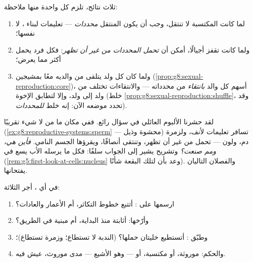 \begin{proposition}\label{prop:g9:heredity-and-traits:conclusions}
ثلاث نتائج، تلزم كل واحدة منها ملاحظة:
\begin{enumerate}
  \item لما كانت  المكتسبة لا تنتقل، وجب أن يكون
        المنتقل \emph{محددات} --- تعليمات لبناء ،
        لا  نفسها؛
  \item ولما كانت  تقفز أجيالًا، أمكن أن
        \emph{تحمل المحددات من غير أن تظهر}: فكل فرد
        يحمل أكثر مما يعرض؛
  \item ولما كان كل ولد يتلقى من والديه معًا بمشيجين
        (\cref{prop:g8:sexual-reproduction:core})، أسهم
        كل والد \emph{بانتقاء} من محدداته ---
        والانتقاءات تختلف من ولد إلى ولد، وإلا لتطابق
        الإخوة (خلط
        \cref{prop:g8:sexual-reproduction:shuffle}، وقد
        تحدد موضعه الآن: إنه خلط \emph{للمحددات}).
\end{enumerate}
\end{proposition}
\admitted

\begin{remark}\label{rem:g9:heredity-and-traits:question}
لقد حشرنا الألبوم العائلي في سؤال رائع. ففي مكان ما من
لا شيء  تقريبًا
(\cref{ex:g8:reproductive-systems:sperm} ---  محشوة
وذيل) تسافر تعليمات لأنف، ولزمرة دم، ولون  ---
تحمل من غير أن تظهر، وتنتقى أنصافًا، ويقرؤها الجسم
النامي. \emph{فأين هي، ومم صنعت؟} وتشريح  يشير إلى
الجواب سلفًا: فكل ما يرسله الأب يسع في 
(\cref{rem:g5:first-look-at-cells:nucleus} وعد بأن لتلك
البقعة شأنًا). والفصلان التاليان يفتحانها.
\end{remark}

\begin{method}\label{met:g9:heredity-and-traits:audit}
في أي ، أجر  الثلاثة:
\begin{enumerate}
  \item ارسمها على : أتتبع خطوط التكاثر، أم
        الأعمار والعادات؟
  \item وأرّخها: أثابتة منذ البداية، أم مبنية في الطريق؟
  \item وطبّق  : أتستطيع خليتان حملها؟ (الندبة
        لا تستطاع؛ وزمرة  تستطاع)؛
  \item والحكم: موروثة، أو مكتسبة، أو --- وهو الأشيع ---
        مدى موروث، عيش فيه.
\end{enumerate}
\end{method}

